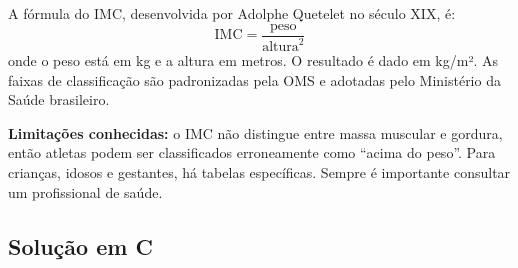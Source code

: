 \documentclass[12pt,a4paper]{article}
\begin{document}
\begin{pesquisa}
A fórmula do IMC, desenvolvida por Adolphe Quetelet no século XIX, é:
\[
\text{IMC} = \frac{\text{peso}}{\text{altura}^2}
\]
onde o peso está em kg e a altura em metros. O resultado é dado em kg/m². As
faixas de classificação são padronizadas pela OMS e adotadas pelo Ministério
da Saúde brasileiro.

\textbf{Limitações conhecidas:} o IMC não distingue entre massa muscular e gordura,
então atletas podem ser classificados erroneamente como ``acima do peso''. Para
crianças, idosos e gestantes, há tabelas específicas. Sempre é importante
consultar um profissional de saúde.
\end{pesquisa}

\subsection*{Solução em C}
\end{document}
